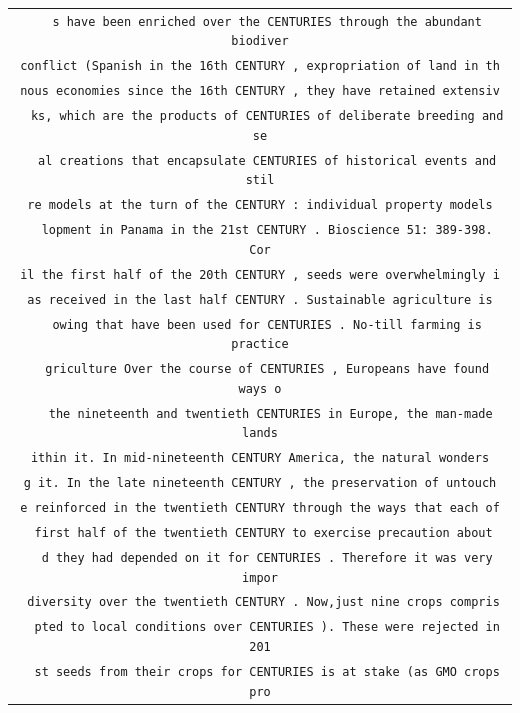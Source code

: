 \begin{table}[H]
\begin{footnotesize}
\centering
\def\arraystretch{1.1}%
 \begin{tabular}{c} 

\texttt{\ \ s have been enriched over the CENTURIES through the abundant biodiver} \\
\texttt{conflict (Spanish in the 16th CENTURY , expropriation of land in th} \\
\texttt{nous economies since the 16th CENTURY , they have retained extensiv} \\
\texttt{\ \ ks, which are the products of CENTURIES of deliberate breeding and se} \\
\texttt{\ \ al creations that encapsulate CENTURIES of historical events and stil} \\
\texttt{re models at the turn of the CENTURY : individual property models} \\ 
\texttt{\ \ lopment in Panama in the 21st CENTURY . Bioscience 51: 389-398. Cor} \\
\texttt{il the first half of the 20th CENTURY , seeds were overwhelmingly i} \\
\texttt{as received in the last half CENTURY . Sustainable agriculture is} \\ 
\texttt{\ \ owing that have been used for CENTURIES . No-till farming is practice} \\
\texttt{\ \ griculture Over the course of CENTURIES , Europeans have found ways o} \\
\texttt{\ \ \ the nineteenth and twentieth CENTURIES in Europe, the man-made lands} \\
\texttt{ithin it. In mid-nineteenth CENTURY America, the natural wonders} \\
\texttt{g it. In the late nineteenth CENTURY , the preservation of untouch} \\
\texttt{e reinforced in the twentieth CENTURY through the ways that each of} \\
\texttt{\ first half of the twentieth CENTURY to exercise precaution about} \\
\texttt{\ \ d they had depended on it for CENTURIES . Therefore it was very impor} \\
\texttt{ diversity over the twentieth CENTURY . Now,just nine crops compris} \\
\texttt{\ \ pted to local conditions over CENTURIES ). These were rejected in 201} \\
\texttt{\ \ st seeds from their crops for CENTURIES is at stake (as GMO crops pro} \\

\end{tabular}
\end{footnotesize}
\end{table}
